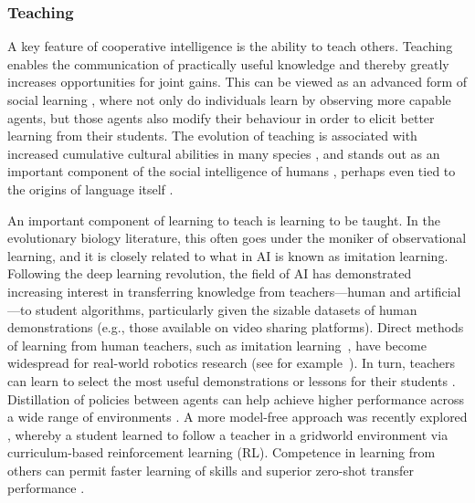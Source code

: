 \documentclass[11pt, a4paper, logo, onecolumn, nonumbering]{deepmind}
\begin{document}
\subsubsection{Teaching}






A key feature of cooperative intelligence is the ability to teach others. Teaching enables the communication of practically useful knowledge and thereby greatly increases opportunities for joint gains. %
This can be viewed as an advanced form of social learning \cite{bandura1977social, hoppitt2013social}, where not only do individuals learn by observing more capable agents, but those agents also modify their behaviour in order to elicit better learning from their students. %
 The evolution of teaching is associated with increased cumulative cultural abilities in many species \cite{thornton2010}, and stands out as an important component of the social intelligence of humans \cite{fogarty2010}, perhaps even tied to the origins of language itself \cite{laland16}. 

An important component of 
learning to teach is learning to be taught. In the evolutionary biology literature, this often goes under the moniker of observational learning, and it is closely related to what in AI is known as imitation learning. Following the deep learning revolution, the field of AI has demonstrated increasing interest in transferring knowledge from teachers---human and artificial---to student algorithms, particularly given the sizable datasets of human demonstrations (e.g., those available on video sharing platforms). Direct methods of learning from human teachers, such as imitation learning~\cite{pomerleau1989alvinn,schaal1999imitation}, have become widespread for real-world robotics research (see for example~\cite{rajeswaran2018learning,abbeel2010autonomous}). In turn, teachers can learn to select the most useful demonstrations or lessons for their students \cite{cakmak2012algorithmic}. Distillation of policies between agents can help achieve higher performance across a wide range of environments \cite{schmitt18}. A more model-free approach was recently explored \cite{DBLP:journals/corr/BorsaPMP17, woodward2020learning}, whereby a student learned to follow a teacher in a gridworld environment via curriculum-based reinforcement learning (RL). Competence in learning from others can permit faster learning of skills and superior zero-shot transfer performance \cite{ndousse2020multi}. 
\end{document}
